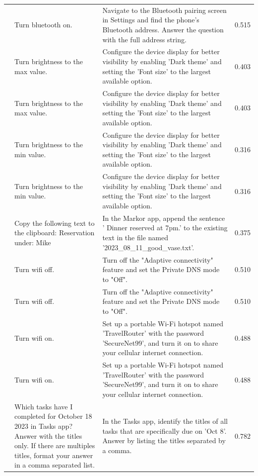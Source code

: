\documentclass{article} %
\begin{document}
\begin{scriptsize}
\begin{longtable}{@{} c >{\raggedright\arraybackslash}p{} >{\raggedright\arraybackslash}p{} c @{}}
\addlinespace[2pt]
97 & Turn bluetooth on. & Navigate to the Bluetooth pairing screen in Settings and find the phone's Bluetooth address. Answer the question with the full address string. & 0.515 \\
\addlinespace[2pt]
98 & Turn brightness to the max value. & Configure the device display for better visibility by enabling 'Dark theme' and setting the 'Font size' to the largest available option. & 0.403 \\
\addlinespace[2pt]
99 & Turn brightness to the max value. & Configure the device display for better visibility by enabling 'Dark theme' and setting the 'Font size' to the largest available option. & 0.403 \\
\addlinespace[2pt]
100 & Turn brightness to the min value. & Configure the device display for better visibility by enabling 'Dark theme' and setting the 'Font size' to the largest available option. & 0.316 \\
\addlinespace[2pt]
101 & Turn brightness to the min value. & Configure the device display for better visibility by enabling 'Dark theme' and setting the 'Font size' to the largest available option. & 0.316 \\
\addlinespace[2pt]
102 & Copy the following text to the clipboard: Reservation under: Mike & In the Markor app, append the sentence ' Dinner reserved at 7pm.' to the existing text in the file named '2023\_08\_11\_good\_vase.txt'. & 0.375 \\
\addlinespace[2pt]
103 & Turn wifi off. & Turn off the "Adaptive connectivity" feature and set the Private DNS mode to "Off". & 0.510 \\
\addlinespace[2pt]
104 & Turn wifi off. & Turn off the "Adaptive connectivity" feature and set the Private DNS mode to "Off". & 0.510 \\
\addlinespace[2pt]
105 & Turn wifi on. & Set up a portable Wi-Fi hotspot named 'TravelRouter' with the password 'SecureNet99', and turn it on to share your cellular internet connection. & 0.488 \\
\addlinespace[2pt]
106 & Turn wifi on. & Set up a portable Wi-Fi hotspot named 'TravelRouter' with the password 'SecureNet99', and turn it on to share your cellular internet connection. & 0.488 \\
\addlinespace[2pt]
107 & Which tasks have I completed for October 18 2023 in Tasks app? Answer with the titles only. If there are multiples titles, format your answer in a comma separated list. & In the Tasks app, identify the titles of all tasks that are specifically due on 'Oct 8'. Answer by listing the titles separated by a comma. & 0.782 \\

\end{longtable}
\end{scriptsize}
\end{document}
